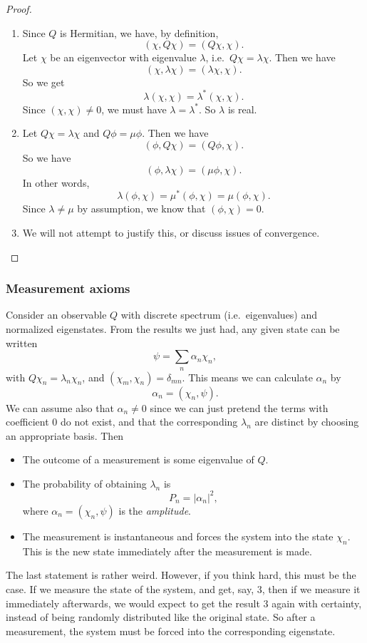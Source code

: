 \documentclass[a4paper]{article}
\begin{document}
\begin{proof}\leavevmode
  \begin{enumerate}
    \item Since $Q$ is Hermitian, we have, by definition,
      \[
        (\chi, Q\chi) = (Q\chi, \chi).
      \]
      Let $\chi$ be an eigenvector with eigenvalue $\lambda$, i.e.\ $Q\chi = \lambda \chi$. Then we have
      \[
        (\chi, \lambda \chi) = (\lambda \chi, \chi).
      \]
      So we get
      \[
        \lambda (\chi, \chi) = \lambda^*(\chi, \chi).
      \]
      Since $(\chi, \chi)\not= 0$, we must have $\lambda = \lambda^*$. So $\lambda$ is real.
    \item Let $Q \chi = \lambda \chi$ and $Q \phi = \mu \phi$. Then we have
      \[
        (\phi, Q\chi) = (Q\phi, \chi).
      \]
      So we have
      \[
        (\phi, \lambda\chi) = (\mu \phi, \chi).
      \]
      In other words,
      \[
        \lambda (\phi, \chi) = \mu^* (\phi, \chi) = \mu (\phi, \chi).
      \]
      Since $\lambda \not= \mu$ by assumption, we know that $(\phi, \chi) = 0$.
    \item We will not attempt to justify this, or discuss issues of convergence.
  \end{enumerate}
\end{proof}

\subsubsection*{Measurement axioms}
Consider an observable $Q$ with discrete spectrum (i.e.\ eigenvalues) and normalized eigenstates. From the results we just had, any given state can be written
\[
  \psi = \sum_n \alpha_n \chi_n,
\]
with $Q\chi_n = \lambda_n \chi_n$, and $(\chi_m, \chi_n) = \delta_{mn}$. This means we can calculate $\alpha_n$ by
\[
  \alpha_n = (\chi_n, \psi).
\]
We can assume also that $\alpha_n \not= 0$ since we can just pretend the terms with coefficient $0$ do not exist, and that the corresponding $\lambda_n$ are distinct by choosing an appropriate basis. Then
\begin{itemize}
  \item The outcome of a measurement is some eigenvalue of $Q$.
  \item The probability of obtaining $\lambda_n$ is
    \[
      P_n = |\alpha_n|^2,
    \]
    where $\alpha_n = (\chi_n, \psi)$ is the \emph{amplitude}.
  \item The measurement is instantaneous and forces the system into the state $\chi_n$. This is the new state immediately after the measurement is made.
\end{itemize}
The last statement is rather weird. However, if you think hard, this must be the case. If we measure the state of the system, and get, say, $3$, then if we measure it immediately afterwards, we would expect to get the result $3$ again with certainty, instead of being randomly distributed like the original state. So after a measurement, the system must be forced into the corresponding eigenstate.
\end{document}

